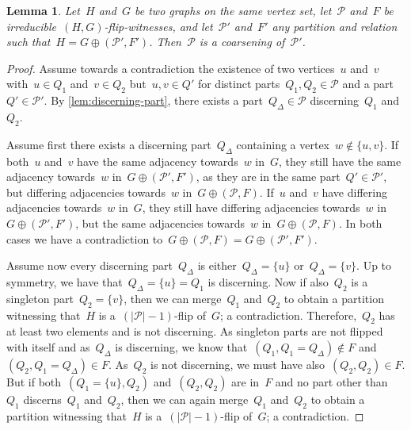 \documentclass[11pt]{article}      \usepackage[margin=1in]{geometry}  \usepackage{microtype}
\newtheorem{lemma}[theorem]{Lemma}
\theoremstyle{definition}
\newcommand{\PP}{\mathcal{P}}
\begin{document}
\begin{lemma}\label{lem:coarsening}
    Let~$H$ and~$G$ be two graphs on the same vertex set, let~$\PP$ and~$F$ be irreducible~$(H,G)$-flip-witnesses, and let~$\PP'$ and~$F'$ any partition and relation such that~$H = G \oplus (\PP',F')$.
    Then~$\PP$ is a coarsening of~$\PP'$.
\end{lemma}
\begin{proof}
    Assume towards a contradiction the existence of two vertices~$u$ and~$v$ with~$u \in Q_1$ and~$v \in Q_2$ but~$u,v \in Q'$ for distinct parts~$Q_1,Q_2 \in \PP$ and a part~$Q' \in \PP'$.
    By \cref{lem:discerning-part}, there exists a part~$Q_\Delta \in \PP$ discerning~$Q_1$ and~$Q_2$.

    Assume first there exists a discerning part~$Q_\Delta$ containing a vertex~$w \notin \{u,v\}$. 
    If both~$u$ and~$v$ have the same adjacency towards~$w$ in~$G$, 
    they still have the same adjacency towards~$w$ in~$G \oplus (\PP',F')$, as they are in the same part~$Q' \in \PP'$, but differing adjacencies towards~$w$ in~$G \oplus (\PP,F)$.
    If~$u$ and~$v$ have differing adjacencies towards~$w$ in~$G$, 
    they still have differing adjacencies towards~$w$ in~$G \oplus (\PP',F')$, but the same adjacencies towards~$w$ in~$G \oplus (\PP,F)$.
    In both cases we have a contradiction to~$G \oplus (\PP,F) = G \oplus (\PP',F')$.    

    Assume now every discerning part~$Q_\Delta$ is either~$Q_\Delta = \{u\}$ or~$Q_\Delta = \{v\}$.
    Up to symmetry, we have that~$Q_\Delta = \{u\} = Q_1$ is discerning.
    Now if also~$Q_2$ is a singleton part~$Q_2 = \{v\}$, then we can merge~$Q_1$ and~$Q_2$ to obtain a partition witnessing that~$H$ is a~$(|\PP|-1)$-flip of~$G$; a contradiction.
    Therefore,~$Q_2$ has at least two elements and is not discerning. 
    As singleton parts are not flipped with itself and as~$Q_\Delta$ is discerning, we know that~$(Q_1,Q_1 = Q_\Delta) \notin F$ and~$(Q_2, Q_1 = Q_\Delta) \in F$.
    As~$Q_2$ is not discerning, we must have also~$(Q_2, Q_2) \in F$.
    But if both~$(Q_1 = \{u\},Q_2)$ and~$(Q_2,Q_2)$ are in~$F$ and no part other than~$Q_1$ discerns~$Q_1$ and~$Q_2$, then we can again merge~$Q_1$ and~$Q_2$ to obtain a partition witnessing that~$H$ is a~$(|\PP|-1)$-flip of~$G$; a contradiction.
\end{proof}
\end{document}
